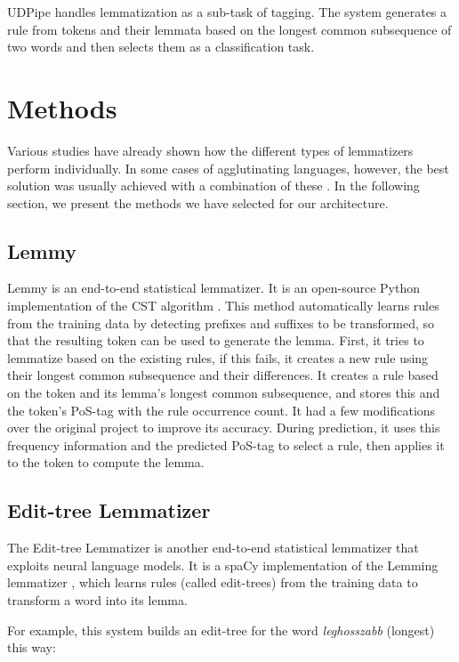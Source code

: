 \documentclass{llncs}
\begin{document}
UDPipe \citep{udpipe} handles lemmatization as a sub-task of tagging. The system generates a rule from tokens and their lemmata based on the longest common subsequence of two words and then selects them as a classification task.

\section{Methods}

Various studies \citep{HuSpaCy:2021, cst-lemmatizer} have already shown how the different types of lemmatizers perform individually. In some cases of agglutinating languages, however, the best solution was usually achieved with a combination of these \citep{orosz2015hybrid}. In the following section, we present the methods we have selected for our architecture.

\subsection{Lemmy}

Lemmy is an end-to-end statistical lemmatizer. It is an open-source Python implementation of the CST algorithm \citep{cst-lemmatizer}. This method automatically learns rules from the training data by detecting prefixes and suffixes to be transformed, so that the resulting token can be used to generate the lemma. First, it tries to lemmatize based on the existing rules, if this fails, it creates a new rule using their longest common subsequence and their differences. It creates a rule based on the token and its lemma’s longest common subsequence, and stores this and the token’s PoS-tag with the rule occurrence count. It had a few modifications over the original project to improve its accuracy. During prediction, it uses this frequency information and the predicted PoS-tag to select a rule, then applies it to the token to compute the lemma.

\subsection{Edit-tree Lemmatizer}

The Edit-tree Lemmatizer is another end-to-end statistical lemmatizer that exploits neural language models. It is a spaCy implementation of the Lemming lemmatizer \citep{muller-etal-2015-joint}, which learns rules (called edit-trees) from the training data to transform a word into its lemma. 

For example, this system builds an edit-tree for the word \textit{leghosszabb} (longest) this way:
\end{document}
